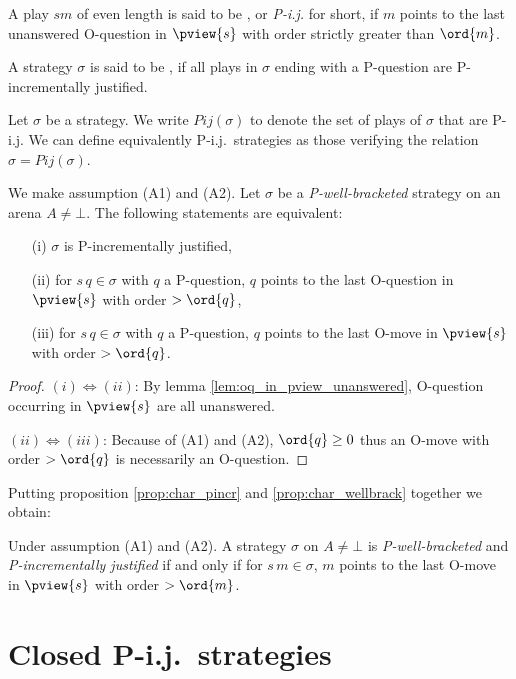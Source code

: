 \begin{definition}\rm
A play $s m$ of even length is said to be , or \emph{P-i.j.} for short, if $m$ points to the last
unanswered O-question in $\pview{s}$ with order strictly greater
than $\ord{m}$.

 A strategy $\sigma$ is said to be , if all plays in $\sigma$ ending with a P-question are
P-incrementally justified.
\end{definition}
Let $\sigma$ be a strategy. We write $Pij(\sigma)$ to denote the set of plays of $\sigma$ that are P-i.j.
We can define equivalently P-i.j.\ strategies as those verifying the relation $\sigma = Pij(\sigma)$.
\begin{proposition}
\label{prop:char_pincr}
\rm We make assumption (A1) and (A2).
Let $\sigma$ be a \emph{P-well-bracketed} strategy on an arena $A\neq \bot$.
The following statements are equivalent:
\begin{enumerate}
\item[(i)] $\sigma$ is P-incrementally justified,
\item[(ii)] for $s \, q \in \sigma$ with $q$ a P-question, $q$ points to the last O-question in $\pview{s}$ with order $>\ord{q}$,
\item[(iii)] for $s \, q \in \sigma$ with $q$ a P-question, $q$ points to the last O-move in $\pview{s}$ with order $>\ord{q}$.
\end{enumerate}
\end{proposition}
\begin{proof}
$(i)\iff(ii)$: By lemma \ref{lem:oq_in_pview_unanswered}, O-question occurring in $\pview{s}$ are all unanswered.

$(ii)\iff(iii)$: Because of (A1) and (A2), $\ord{q} \geq 0$ thus an O-move with order $>\ord{q}$ is necessarily an O-question.
\end{proof}

Putting proposition \ref{prop:char_pincr} and
\ref{prop:char_wellbrack} together we obtain:
\begin{proposition}
Under assumption (A1) and (A2).
A strategy $\sigma$ on $A\neq \bot$
is \emph{P-well-bracketed} and
 \emph{P-incrementally justified} if and only if
for $s \, m \in \sigma$, $m$ points to the last O-move in $\pview{s}$ with order $>\ord{m}$.
\end{proposition}




\section{Closed P-i.j.\ strategies}
\label{sec:closedpij}

